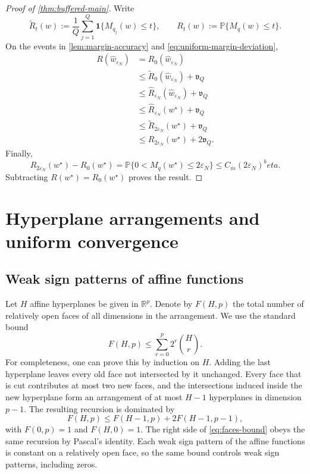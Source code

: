 \documentclass[11pt]{article}
\def\beta{beta}%
\newcommand{\Pp}{\mathbb P}
\newcommand{\R}{\mathbb R}
\newcommand{\one}{\mathbf 1}
\newcommand{\eps}{\varepsilon}
\begin{document}
\begin{proof}[Proof of \cref{thm:buffered-main}]
Write
\[
\widetilde R_t(w)
:=
\frac1Q\sum_{j=1}^Q\one\{M_{q_j}(w)\le t\},
\qquad
R_t(w)
:=
\Pp\{M_q(w)\le t\}.
\]
On the events in \cref{lem:margin-accuracy} and \eqref{eq:uniform-margin-deviation},
\begin{align*}
R(\widehat w_{\eps_N})
&=R_0(\widehat w_{\eps_N})\\
&\le\widetilde R_0(\widehat w_{\eps_N})+\mathfrak v_Q\\
&\le\widehat R_{\eps_N}(\widehat w_{\eps_N})+\mathfrak v_Q\\
&\le\widehat R_{\eps_N}(w^\star)+\mathfrak v_Q\\
&\le\widetilde R_{2\eps_N}(w^\star)+\mathfrak v_Q\\
&\le R_{2\eps_N}(w^\star)+2\mathfrak v_Q.
\end{align*}
Finally,
\[
R_{2\eps_N}(w^\star)-R_0(w^\star)
=
\Pp\{0<M_q(w^\star)\le2\eps_N\}
\le C_m(2\eps_N)^\beta.
\]
Subtracting $R(w^\star)=R_0(w^\star)$ proves the result.
\end{proof}

\section{Hyperplane arrangements and uniform convergence}
\label{app:capacity}

\subsection{Weak sign patterns of affine functions}

Let $H$ affine hyperplanes be given in $\R^p$.  Denote by $F(H,p)$ the total number of relatively open faces of all dimensions in the arrangement.  We use the standard bound
\begin{equation}
\label{eq:faces-bound}
F(H,p)
\le
\sum_{r=0}^{p}2^r\binom Hr.
\end{equation}
For completeness, one can prove this by induction on $H$.  Adding the last hyperplane leaves every old face not intersected by it unchanged.  Every face that is cut contributes at most two new faces, and the intersections induced inside the new hyperplane form an arrangement of at most $H-1$ hyperplanes in dimension $p-1$.  The resulting recursion is dominated by
\[
F(H,p)\le F(H-1,p)+2F(H-1,p-1),
\]
with $F(0,p)=1$ and $F(H,0)=1$.  The right side of \eqref{eq:faces-bound} obeys the same recursion by Pascal's identity.  Each weak sign pattern of the affine functions is constant on a relatively open face, so the same bound controls weak sign patterns, including zeros.
\end{document}
